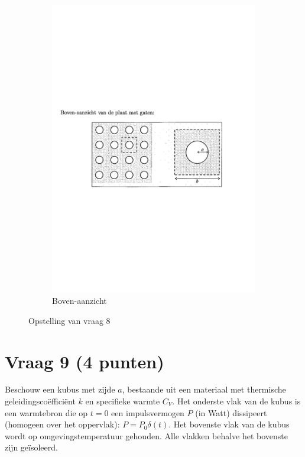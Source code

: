 \documentclass[a4paper]{article}
\begin{document}
\begin{figure}[ht]
\begin{subfigure}[b]{0.5\textwidth}
        \includegraphics[width=\textwidth]{vraag8-2}
        \caption{Boven-aanzicht}
        \label{fig:vraag82}
    \end{subfigure}
    \caption{Opstelling van vraag 8}
    \label{fig:vraag8}
\end{figure}

\section*{Vraag 9 (4 punten)}
Beschouw een kubus met zijde $a$, bestaande uit een materiaal met thermische geleidingscoëfficiënt $k$ en specifieke warmte $C_V$. Het onderste vlak van de kubus is een warmtebron die op $t = 0$ een impulsvermogen $P$ (in Watt) dissipeert (homogeen over het oppervlak): $P = P_0\delta(t)$. Het bovenste vlak van de kubus wordt op omgevingstemperatuur gehouden. Alle vlakken behalve het bovenste zijn geïsoleerd.
\end{document}
